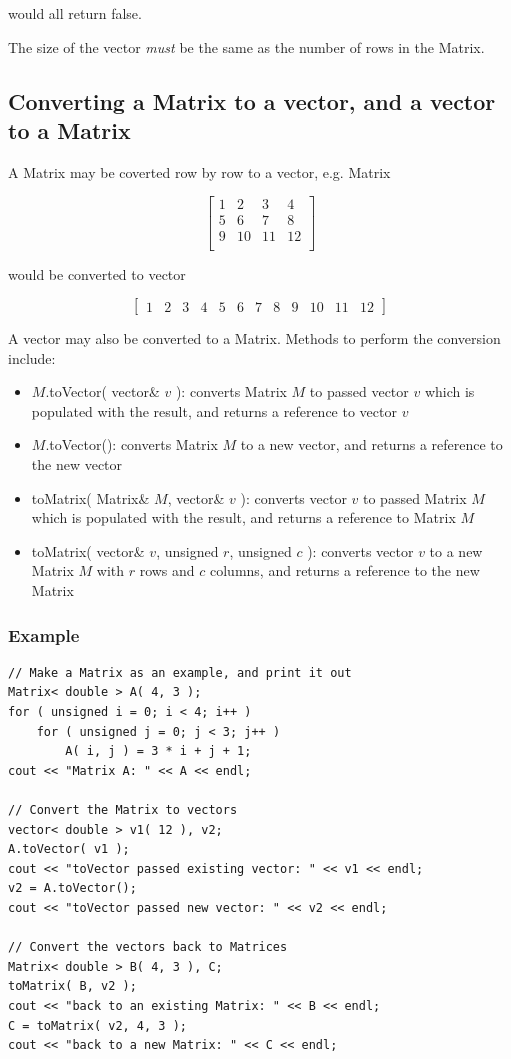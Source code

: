 \documentclass{report}
\begin{document}
would all return false.

The size of the vector {\em must} be the same as the number of rows in
the Matrix.

\subsection{Converting a Matrix to a vector, and a vector to a Matrix}

A Matrix may be coverted row by row to a vector, e.g. Matrix

\[ \left[ \begin{array}{cccc}
1 & 2 & 3 & 4 \\
5 & 6 & 7 & 8 \\
9 & 10 & 11 & 12 \\
\end{array} \right] \]

would be converted to vector

\[ \left[ \begin{array}{cccccccccccc}
1 & 2 & 3 & 4 & 5 & 6 & 7 & 8 & 9 & 10 & 11 & 12
\end{array} \right] \]

A vector may also be converted to a Matrix.  Methods to perform the
conversion include:

\begin{itemize}
\item $M$.toVector( vector\& $v$ ): converts Matrix $M$ to passed
      vector $v$ which is populated with the result, and returns a
      reference to vector $v$
\item $M$.toVector(): converts Matrix $M$ to a new vector, and returns
      a reference to the new vector
\item toMatrix( Matrix\& $M$, vector\& $v$ ): converts vector $v$ to
      passed Matrix $M$ which is populated with the result, and
      returns a reference to Matrix $M$
\item toMatrix( vector\& $v$, unsigned $r$, unsigned $c$ ): converts
      vector $v$ to a new Matrix $M$ with $r$ rows and $c$ columns,
      and returns a reference to the new Matrix
\end{itemize}

\subsubsection{Example}
\begin{verbatim}
// Make a Matrix as an example, and print it out
Matrix< double > A( 4, 3 );
for ( unsigned i = 0; i < 4; i++ )
    for ( unsigned j = 0; j < 3; j++ )
        A( i, j ) = 3 * i + j + 1;
cout << "Matrix A: " << A << endl;

// Convert the Matrix to vectors
vector< double > v1( 12 ), v2;
A.toVector( v1 );
cout << "toVector passed existing vector: " << v1 << endl;
v2 = A.toVector();
cout << "toVector passed new vector: " << v2 << endl;

// Convert the vectors back to Matrices
Matrix< double > B( 4, 3 ), C;
toMatrix( B, v2 );
cout << "back to an existing Matrix: " << B << endl;
C = toMatrix( v2, 4, 3 );
cout << "back to a new Matrix: " << C << endl;
\end{verbatim}
\end{document}
